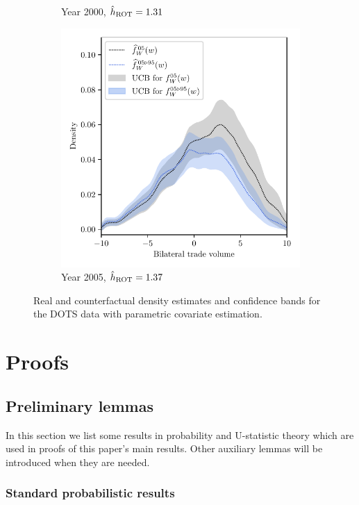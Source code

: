 \begin{figure}[ht]
\begin{subfigure}{0.32\textwidth}
    \caption{Year 2000, $\hat h_{\operatorname{ROT}} = 1.31$}
  \end{subfigure}
  \begin{subfigure}{0.32\textwidth}
    \centering
    \includegraphics[scale=0.48]{graphics/trade_plot_parametric_1995_2005.pdf}
    \caption{Year 2005, $\hat h_{\operatorname{ROT}} = 1.37$}
  \end{subfigure}
  \caption{Real and counterfactual density estimates
    and confidence bands for the DOTS data
  with parametric covariate estimation.}
  \label{fig:trade_para}
\end{figure}

\section{Proofs}

\subsection{Preliminary lemmas}

In this section we list some results
in probability and U-statistic theory
which are used in proofs of this paper's main results.
Other auxiliary lemmas will be introduced when
they are needed.

\subsubsection{Standard probabilistic results}

